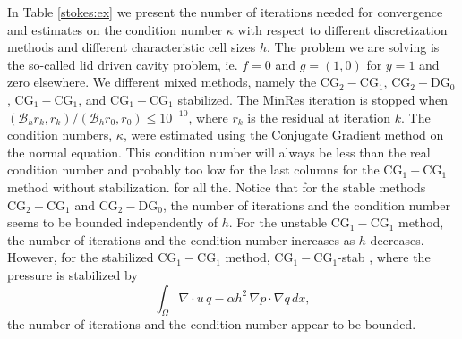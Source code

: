 In Table \ref{stokes:ex} 
we present the number of iterations needed for convergence 
and estimates on the condition number $\kappa$ with 
respect to different discretization methods and different characteristic cell sizes $h$. The problem we
are solving is the so-called lid driven cavity problem, ie. $f=0$ and $g = (1,0)$ for $y=1$ and zero elsewhere.   
We different mixed methods, namely  the  $\mathrm{CG}_2-\mathrm{CG}_1$, $\mathrm{CG}_2-\mathrm{DG}_0$,  
$\mathrm{CG}_1-\mathrm{CG}_1$, and  $\mathrm{CG}_1-\mathrm{CG}_1$ stabilized.  
The MinRes iteration is stopped when 
$(\mathcal{B}_h r_k, r_k)/(\mathcal{B}_h r_0, r_0) \le 10^{-10}$, where $r_k$ is the residual at
iteration $k$. 
The condition numbers, $\kappa$, were estimated using the Conjugate Gradient method on the
normal equation. This condition number will always be less 
than the real condition number and probably too low
for the last columns for the $\mathrm{CG}_1-\mathrm{CG}_1$ method without stabilization. 
for all the. 
Notice that for the stable methods $\mathrm{CG}_2-\mathrm{CG}_1$ and $\mathrm{CG}_2-\mathrm{DG}_0$,
the number of iterations and the condition number seems to be bounded
independently of $h$. For the unstable $\mathrm{CG}_1-\mathrm{CG}_1$ method, the number of iterations
and the condition number increases as $h$ decreases. However, for 
the stabilized $\mathrm{CG}_1-\mathrm{CG}_1$ method, $\mathrm{CG}_1-\mathrm{CG}_1$-stab , where the pressure is stabilized by 
\[
\int_\Omega \nabla \cdot u \, q  - \alpha h^2 \, \nabla p \cdot \nabla q \, dx,       
\]
the number of iterations and the condition number appear to be bounded. 

